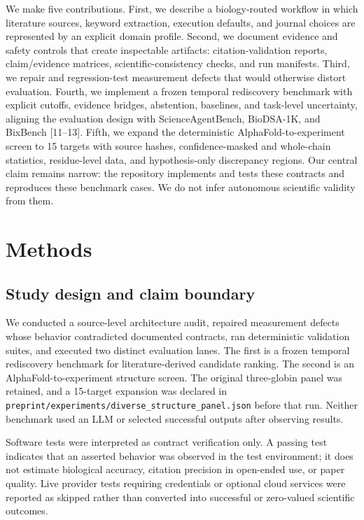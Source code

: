 \documentclass[11pt]{article}
\begin{document}
We make five contributions. First, we describe a biology-routed workflow in which literature sources, keyword extraction, execution defaults, and journal choices are represented by an explicit domain profile. Second, we document evidence and safety controls that create inspectable artifacts: citation-validation reports, claim/evidence matrices, scientific-consistency checks, and run manifests. Third, we repair and regression-test measurement defects that would otherwise distort evaluation. Fourth, we implement a frozen temporal rediscovery benchmark with explicit cutoffs, evidence bridges, abstention, baselines, and task-level uncertainty, aligning the evaluation design with ScienceAgentBench, BioDSA-1K, and BixBench [11--13]. Fifth, we expand the deterministic AlphaFold-to-experiment screen to 15 targets with source hashes, confidence-masked and whole-chain statistics, residue-level data, and hypothesis-only discrepancy regions. Our central claim remains narrow: the repository implements and tests these contracts and reproduces these benchmark cases. We do not infer autonomous scientific validity from them.

\section{Methods}

\subsection{Study design and claim boundary}

We conducted a source-level architecture audit, repaired measurement defects whose behavior contradicted documented contracts, ran deterministic validation suites, and executed two distinct evaluation lanes. The first is a frozen temporal rediscovery benchmark for literature-derived candidate ranking. The second is an AlphaFold-to-experiment structure screen. The original three-globin panel was retained, and a 15-target expansion was declared in \nolinkurl{preprint/experiments/diverse_structure_panel.json} before that run. Neither benchmark used an LLM or selected successful outputs after observing results.

Software tests were interpreted as contract verification only. A passing test indicates that an asserted behavior was observed in the test environment; it does not estimate biological accuracy, citation precision in open-ended use, or paper quality. Live provider tests requiring credentials or optional cloud services were reported as skipped rather than converted into successful or zero-valued scientific outcomes.
\end{document}
